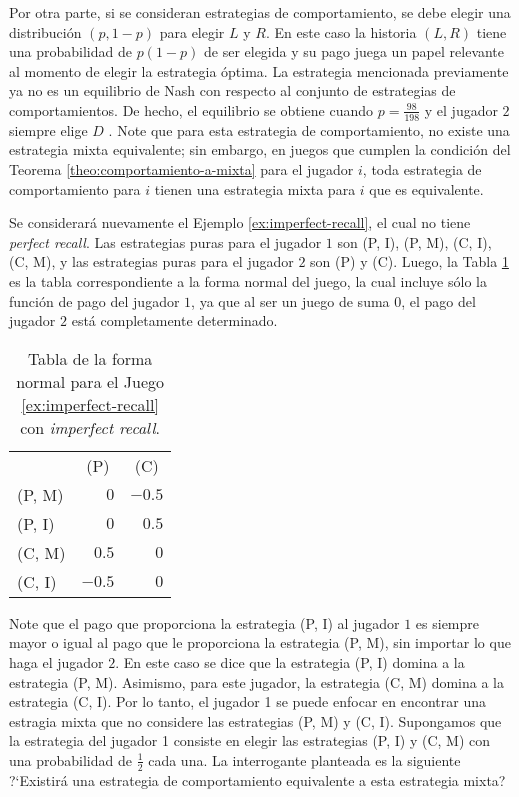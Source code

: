 Por otra parte, si se consideran estrategias de comportamiento, se debe elegir una distribución $(p, 1-p)$ para elegir $L$ y $R$. En este caso la historia $(L, R)$ tiene una probabilidad de $p(1-p)$ de ser elegida y su pago juega un papel relevante al momento de elegir la estrategia óptima. La estrategia mencionada previamente ya no es un equilibrio de Nash con respecto al conjunto de estrategias de comportamientos. De hecho, el equilibrio se obtiene cuando $p = \frac{98}{198}$ y el jugador $2$ siempre elige $D$ \cite[p.~44]{bib:handbook-blai}. Note que para esta estrategia de comportamiento, no existe una estrategia mixta equivalente; sin embargo, en juegos que cumplen la condición del Teorema \ref{theo:comportamiento-a-mixta} para el jugador $i$, toda estrategia de comportamiento para $i$ tienen una estrategia mixta para $i$ que es equivalente.


Se considerará nuevamente el Ejemplo \ref{ex:imperfect-recall}, el cual no tiene \textit{perfect recall}. Las estrategias puras para el jugador $1$ son (P, I), (P, M), (C, I), (C, M), y las estrategias puras para el jugador $2$ son (P) y (C). Luego, la Tabla \ref{table:imperfect-recall} es la tabla correspondiente a la forma normal del juego, la cual incluye sólo la función de pago del jugador $1$, ya que al ser un juego de suma $0$, el pago del jugador $2$ está completamente determinado.

\begin{table}[h]
\begin{center}
\caption[Tabla de la forma normal para un juego con \textit{imperfect recall}]{Tabla de la forma normal para el Juego \ref{ex:imperfect-recall} con \textit{imperfect recall}.}
\label{table:imperfect-recall}
\begin{tabular}{l | r | r |}
\multicolumn{1}{c}{} & \multicolumn{1}{c}{(P)} & \multicolumn{1}{c}{(C)} \\ \cline{2-3}
(P, M)     & $0$ & $-0.5$ \\ \cline{2-3}
(P, I) & $0$ & $0.5$ \\ \cline{2-3}
(C, M)     & $0.5$ & $0$ \\ \cline{2-3}
(C, I) & $-0.5$ & $0$ \\ \cline{2-3}
\end{tabular}
\end{center}
\end{table}

Note que el pago que proporciona la estrategia (P, I) al jugador $1$ es siempre mayor o igual al pago que le proporciona la estrategia (P, M), sin importar lo que haga el jugador $2$. En este caso se dice que la estrategia (P, I) domina a la estrategia (P, M). Asimismo, para este jugador, la estrategia (C, M) domina a la estrategia (C, I). Por lo tanto, el jugador 1 se puede enfocar en encontrar una estragia mixta que no considere las estrategias (P, M) y (C, I). Supongamos que la estrategia del jugador 1 consiste en elegir las estrategias (P, I) y (C, M) con una probabilidad de $\frac{1}{2}$ cada una. La interrogante planteada es la siguiente ?`Existirá una estrategia de comportamiento equivalente a esta estrategia mixta?

